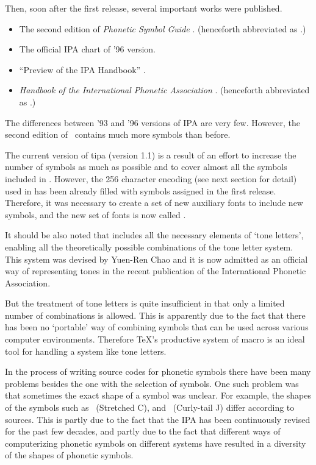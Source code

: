 Then, soon after the first release, several important works were
published.

\begin{itemize}
\item The second edition of \emph{Phonetic Symbol Guide}
  \citep{PSG:II}. (henceforth abbreviated as \PSG.)
\item The official IPA chart of '96 version.
\item ``Preview of the IPA Handbook'' \citep{IPA:Preview}.
\item \emph{Handbook of the International Phonetic Association}
  \citep{Handbook}. (henceforth abbreviated as \Handbook.)
\end{itemize}

The differences between '93 and '96 versions of IPA are very
few. However, the second edition of \PSG\ contains much more symbols
than before.

The current version of tipa{} (version 1.1) is a result of an effort
to increase the number of symbols as much as possible and to cover
almost all the symbols included in \PSG.  However, the 256 character
encoding (see next section for detail) used in \tipa{} has been
already filled with symbols assigned in the first release. Therefore,
it was necessary to create a set of new auxiliary fonts to include
new symbols, and the new set of fonts is now called \tipx{}.

It should be also noted that \tipa{} includes all the necessary
elements of `tone letters', enabling all the theoretically possible
combinations of the tone letter system. This system was devised by
Yuen-Ren Chao \citep{Chao:ToneLetters} and it is now admitted as an
official way of representing tones in the recent publication of the
International Phonetic Association.

But the treatment of tone letters is quite insufficient in that only a
limited number of combinations is allowed. This is apparently due to
the fact that there has been no `portable' way of combining symbols
that can be used across various computer environments. Therefore
\TeX's productive system of macro is an ideal tool for handling a
system like tone letters.

In the process of writing \MF{} source codes for \tipa{} phonetic
symbols there have been many problems besides the one with the
selection of symbols.  One such problem was that sometimes the
exact shape of a symbol was unclear.  For example, the shapes of the
symbols such as \textstretchc\ (Stretched C), and \textctj\ (Curly-tail J)
differ according to sources. This is partly due to the fact that the
IPA has been continuously revised for the past few decades, and partly
due to the fact that different ways of computerizing phonetic symbols
on different systems have resulted in a diversity of the shapes of
phonetic symbols.


